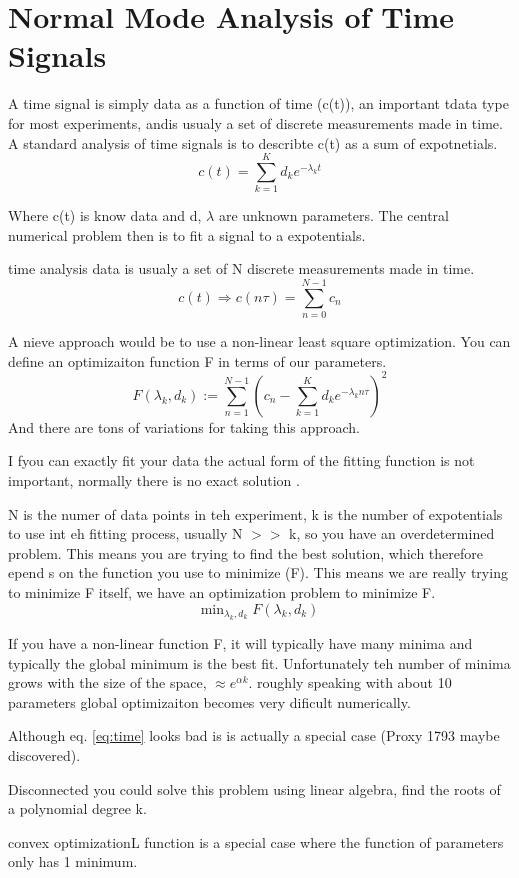 \documentclass{article}
\newcommand{\be}{\begin{equation}}
\newcommand{\ee}{\end{equation}}
\begin{document}
\section{Normal Mode Analysis of Time Signals}
A time signal is simply data as a function of time (c(t)), an important tdata type for most experiments, 
andis usualy a set of discrete measurements made in time. 
A standard analysis of time signals is to describte c(t) as a sum of expotnetials.
\be\label{eq:time}
c(t) = \sum_{k=1}^K d_k e^{-\lambda_kt}
\ee

Where c(t) is know data and d, $\lambda$ are unknown parameters.
The central numerical problem then is to fit a signal to a expotentials. 

time analysis data is usualy a set of N discrete measurements made in time. 
\be
c(t) \Rightarrow c(n\tau) = \sum_{n=0}^{N-1} c_n
\ee

A nieve approach would be to use a non-linear least square optimization.
You can define an optimizaiton function F in terms of our parameters.
\be
F(\lambda_k,d_k) := \sum_{n=1}^{N-1}\left( c_n - \sum_{k=1}^K d_k e^{-\lambda_kn\tau}  \right)^2
\ee
And there are tons of variations for taking this approach. 

I fyou can exactly fit your data the actual form of the fitting function is not important, normally there is no exact solution .

N is the numer of data points in teh experiment, k is the number of expotentials to use int eh fitting process, usually N $>>$ k, so you have an overdetermined problem.
This means you are trying to find the best solution, which therefore epend s on the function you use to minimize (F). 
This means we are really trying to minimize F itself, we have an optimization problem to minimize F. 
\be
\text{min}_{\lambda_k,d_k}\; F(\lambda_k,d_k)
\ee

If you have a non-linear function F, it will typically have many minima and typically the global minimum is the best fit. 
Unfortunately teh number of minima grows with the size of the space, $\approx e^{\alpha k}$.
roughly speaking with about 10 parameters global optimizaiton becomes very dificult numerically. 

Although eq. \ref{eq:time} looks bad is is actually a special case (Proxy 1793 maybe discovered). 

Disconnected you could solve this problem using linear algebra, find the roots of a polynomial degree k. 

convex optimizationL function is a special case where the function of parameters only has 1 minimum. 
\end{document}
